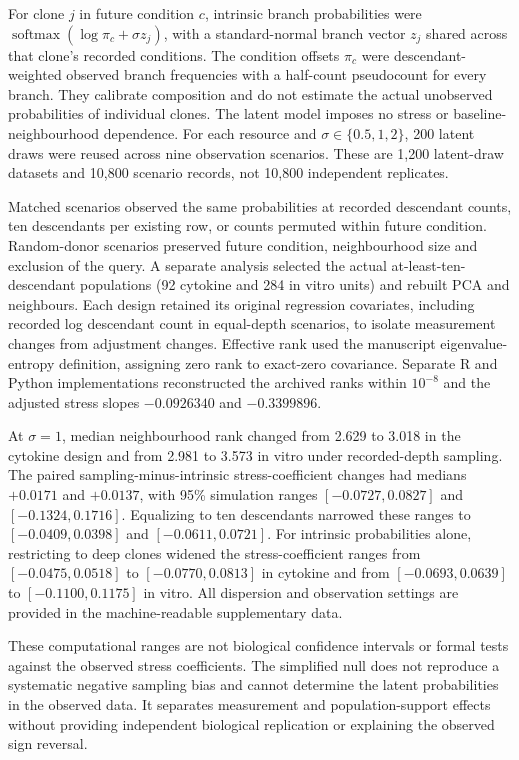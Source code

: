 \documentclass[a4paper,fleqn]{cas-sc}
\makeatletter
\DeclareRobustCommand{\rev}[1]{{\color{red}\def\@citecolor{black}\def\@linkcolor{red}\def\@urlcolor{red}#1}}
\makeatother
\begin{document}
\rev{For clone $j$ in future condition $c$, intrinsic branch probabilities were $\operatorname{softmax}(\log\pi_c+\sigma z_j)$, with a standard-normal branch vector $z_j$ shared across that clone's recorded conditions.} \rev{The condition offsets $\pi_c$ were descendant-weighted observed branch frequencies with a half-count pseudocount for every branch.} \rev{They calibrate composition and do not estimate the actual unobserved probabilities of individual clones.} \rev{The latent model imposes no stress or baseline-neighbourhood dependence.} \rev{For each resource and $\sigma\in\{0.5,1,2\}$, 200 latent draws were reused across nine observation scenarios.} \rev{These are 1,200 latent-draw datasets and 10,800 scenario records, not 10,800 independent replicates.}

\rev{Matched scenarios observed the same probabilities at recorded descendant counts, ten descendants per existing row, or counts permuted within future condition.} \rev{Random-donor scenarios preserved future condition, neighbourhood size and exclusion of the query.} \rev{A separate analysis selected the actual at-least-ten-descendant populations (92 cytokine and 284 in vitro units) and rebuilt PCA and neighbours.} \rev{Each design retained its original regression covariates, including recorded log descendant count in equal-depth scenarios, to isolate measurement changes from adjustment changes.} \rev{Effective rank used the manuscript eigenvalue-entropy definition, assigning zero rank to exact-zero covariance.} \rev{Separate R and Python implementations reconstructed the archived ranks within $10^{-8}$ and the adjusted stress slopes $-0.0926340$ and $-0.3399896$.}

\rev{At $\sigma=1$, median neighbourhood rank changed from 2.629 to 3.018 in the cytokine design and from 2.981 to 3.573 in vitro under recorded-depth sampling.} \rev{The paired sampling-minus-intrinsic stress-coefficient changes had medians $+0.0171$ and $+0.0137$, with 95\% simulation ranges $[-0.0727,0.0827]$ and $[-0.1324,0.1716]$.} \rev{Equalizing to ten descendants narrowed these ranges to $[-0.0409,0.0398]$ and $[-0.0611,0.0721]$.} \rev{For intrinsic probabilities alone, restricting to deep clones widened the stress-coefficient ranges from $[-0.0475,0.0518]$ to $[-0.0770,0.0813]$ in cytokine and from $[-0.0693,0.0639]$ to $[-0.1100,0.1175]$ in vitro.} \rev{All dispersion and observation settings are provided in the machine-readable supplementary data.}

\rev{These computational ranges are not biological confidence intervals or formal tests against the observed stress coefficients.} \rev{The simplified null does not reproduce a systematic negative sampling bias and cannot determine the latent probabilities in the observed data.} \rev{It separates measurement and population-support effects without providing independent biological replication or explaining the observed sign reversal.}
\end{document}
